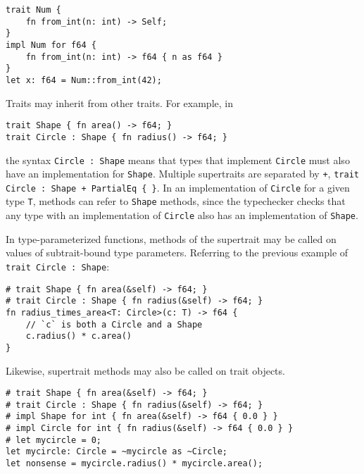 \documentclass[]{article}
\begin{document}
\begin{verbatim}
trait Num {
    fn from_int(n: int) -> Self;
}
impl Num for f64 {
    fn from_int(n: int) -> f64 { n as f64 }
}
let x: f64 = Num::from_int(42);
\end{verbatim}

Traits may inherit from other traits. For example, in

\begin{verbatim}
trait Shape { fn area() -> f64; }
trait Circle : Shape { fn radius() -> f64; }
\end{verbatim}

the syntax \texttt{Circle : Shape} means that types that implement
\texttt{Circle} must also have an implementation for \texttt{Shape}.
Multiple supertraits are separated by \texttt{+},
\texttt{trait Circle : Shape + PartialEq \{ \}}. In an implementation of
\texttt{Circle} for a given type \texttt{T}, methods can refer to
\texttt{Shape} methods, since the typechecker checks that any type with
an implementation of \texttt{Circle} also has an implementation of
\texttt{Shape}.

In type-parameterized functions, methods of the supertrait may be called
on values of subtrait-bound type parameters. Referring to the previous
example of \texttt{trait Circle : Shape}:

\begin{verbatim}
# trait Shape { fn area(&self) -> f64; }
# trait Circle : Shape { fn radius(&self) -> f64; }
fn radius_times_area<T: Circle>(c: T) -> f64 {
    // `c` is both a Circle and a Shape
    c.radius() * c.area()
}
\end{verbatim}

Likewise, supertrait methods may also be called on trait objects.

\begin{verbatim}
# trait Shape { fn area(&self) -> f64; }
# trait Circle : Shape { fn radius(&self) -> f64; }
# impl Shape for int { fn area(&self) -> f64 { 0.0 } }
# impl Circle for int { fn radius(&self) -> f64 { 0.0 } }
# let mycircle = 0;
let mycircle: Circle = ~mycircle as ~Circle;
let nonsense = mycircle.radius() * mycircle.area();
\end{verbatim}

\end{document}

